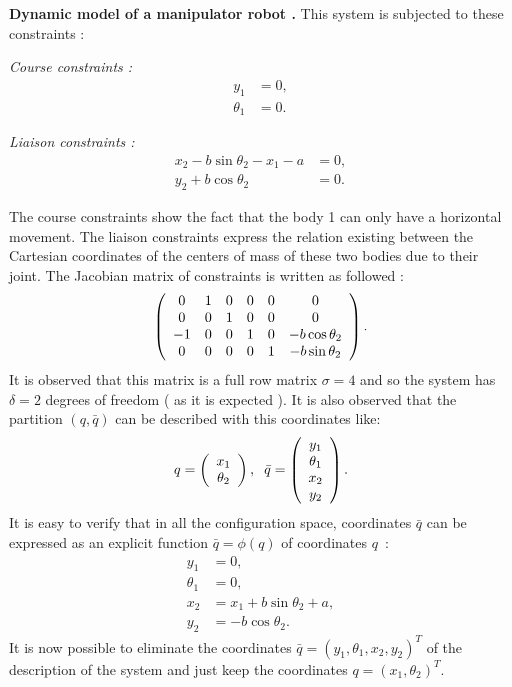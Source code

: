 \begin{exemple} {\bf Dynamic model of a manipulator robot .}
This system is subjected to these constraints  :
\begin{description}
\item {\em Course  constraints  :}
\begin{equation*} \begin{split}
y_1 &= 0, \\
\theta_1 &= 0.
\end{split} \end{equation*}
\item {\em Liaison constraints   :}
\begin{equation*} \begin{split}
x_2 - b\sin\theta_2 - x_1 - a&= 0, \\
y_2 + b\cos\theta_2 &= 0.
\end{split} \end{equation*}
\end{description}
\noindent The course constraints show the fact that the body 1 can only have a horizontal movement. The liaison constraints express the relation existing between the Cartesian coordinates of the centers of mass of these two bodies due to their joint. The Jacobian matrix of constraints is written as followed :
$$
\bma{cccccc} 0 & 1 & 0 & 0 & 0 & 0 \\ 
0 & 0 & 1 & 0 & 0 & 0\\ -1 & 0 & 0 & 1 & 0 & -b\cos\theta_2 \\
0 & 0 & 0 & 0 & 1 & -b\sin\theta_2 \ema.
$$
It is observed that this matrix is a full row matrix  $\sigma = 4$ and so the system has $\delta = 2$ degrees of freedom ( as it is expected ). It is also observed that the partition $(q,\bar{q})$ can be described with this coordinates like:
$$
q = \bma{c} x_1 \\ \theta_2 \ema, \hh 
\bar{q} = \bma{c} y_1 \\ \theta_1 \\ x_2 \\ y_2\ema.
$$
It is easy to verify that in all the configuration space, coordinates 
$\bar{q}$ can be expressed as an explicit function  $\bar{q} = \phi(q)$ of coordinates  $q$~:
\begin{align}
y_1 &= 0, \label{c1} \\
\theta_1 &= 0, \label{c2} \\
x_2 &= x_1 + b\sin\theta_2 + a, \label{c3} \\
y_2 &= - b\cos\theta_2. \label{c4}
\end{align}
It is now possible to eliminate the coordinates  $\bar{q}=(y_1, \theta_1, x_2, y_2)^{T}$ of the description of the system and just keep the coordinates $q=(x_1, \theta_2)^{T}$.

\end{exemple}
